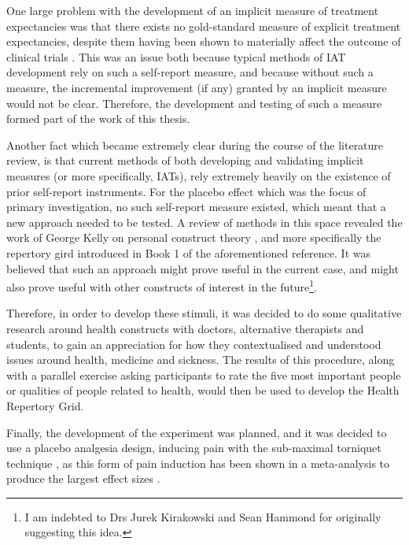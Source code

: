 One large problem with the development of an implicit measure of
treatment expectancies was that there exists no gold-standard measure
of explicit treatment expectancies, despite them having been shown to
materially affect the outcome of clinical trials
\cite{Linde2007,Bausell2005,Benedetti2005}. This was an issue both
because typical methods of IAT development rely on such a self-report
measure, and because without such a measure, the incremental
improvement (if any) granted by an implicit measure would not be
clear. Therefore, the development and testing of such a measure formed
part of the work of this thesis.

Another fact which became extremely clear during the course of the
literature review, is that current methods of both developing and
validating implicit measures (or more specifically, IATs), rely
extremely heavily on the existence of prior self-report instruments.
For the placebo effect which was the focus of primary investigation,
no such self-report measure existed, which meant that a new approach
needed to be tested. A review of methods in this space revealed the
work of George Kelly on personal construct theory \cite{Kelly1991},
and more specifically the repertory gird introduced in Book 1 of the
aforementioned reference. It was believed that such an approach might
prove useful in the current case, and might also prove useful with
other constructs of interest in the future\footnote{I am indebted to
Drs Jurek Kirakowski and Sean Hammond for originally suggesting this
idea.}.

Therefore, in order to develop these stimuli, it was decided to do
some qualitative research around health constructs with doctors,
alternative therapists and students, to gain an appreciation for how
they contextualised and understood issues around health, medicine and
sickness. The results of this procedure, along with a parallel
exercise asking participants to rate the five most important people or
qualities of people related to health, would then be used to develop
the Health Repertory Grid.

Finally, the development of the experiment was planned, and it was
decided to use a placebo analgesia design, inducing pain with the
sub-maximal torniquet technique \cite{moore1979submaximal}, as this
form of pain induction has been shown in a meta-analysis to produce
the largest effect sizes \cite{Sauro2005}.




